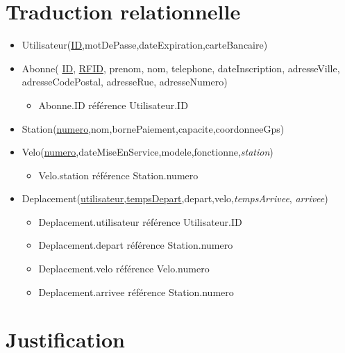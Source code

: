 \documentclass[a4paper, 12pt]{report}
\begin{document}
\section*{Traduction relationnelle} %
	
	\begin{itemize}
	
		\item Utilisateur(\underline{ID},motDePasse,dateExpiration,carteBancaire)
		
		\item Abonne( \underline{ID}, \underline{RFID}, prenom, nom, telephone, dateInscription, 				adresseVille, adresseCodePostal, adresseRue, adresseNumero)
		
		\begin{itemize}
			\item Abonne.ID référence Utilisateur.ID
		\end{itemize}
		
		\item Station(\underline{numero},nom,bornePaiement,capacite,coordonneeGps)
		
		\item Velo(\underline{numero},dateMiseEnService,modele,fonctionne,\textit{station})
		
		\begin{itemize}
			\item Velo.station référence Station.numero
		\end{itemize}
		
		\item Deplacement(\underline{utilisateur,tempsDepart},depart,velo,\textit{tempsArrivee},				\textit{arrivee})
		
		\begin{itemize}
			\item Deplacement.utilisateur référence Utilisateur.ID
			\item Deplacement.depart référence Station.numero
			\item Deplacement.velo référence Velo.numero
			\item Deplacement.arrivee référence Station.numero
		\end{itemize}
		
	\end{itemize}

\section*{Justification} %
\end{document}
